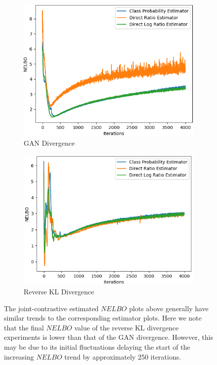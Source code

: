 \documentclass[honours,12pt, twoside]{unswthesis}
\numberwithin{equation}{section}
\theoremstyle{definition}
\begin{document}
\begin{figure}[h]
\begin{subfigure}{0.49\textwidth}
\includegraphics[width=\linewidth]{part2nelbos/JCADVvsJCADVexpvsJCADVgudlog.png}
\caption{GAN Divergence}
\end{subfigure}
\begin{subfigure}{0.49\textwidth}
\includegraphics[width=\linewidth]{part2nelbos/JCKLDvsJCKLexpvsJCKLgudlog.png}
\caption{Reverse KL Divergence}
\end{subfigure}
\caption{\small The joint-contrastive estimated $NELBO$ plots above generally have similar trends to the corresponding estimator plots. Here we note that the final $NELBO$ value of the reverse KL divergence experiments is lower than that of the GAN divergence. However, this may be due to its initial fluctuations delaying the start of the increasing $NELBO$ trend by approximately 250 iterations.}
\end{figure}
\newpage
\end{document}
